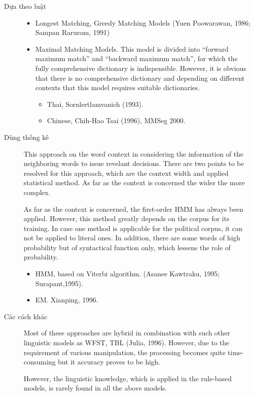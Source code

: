 \documentclass[a4paper,oneside]{book} %
\begin{document}
\begin{description}
\item[Dựa theo luật] 
  \begin{itemize}
  \item Longest Matching, Greedy Matching Models (Yuen Poowarawan, 1986;
    Sampan Rarurom, 1991)
  \item Maximal Matching Models. This model is divided into ``forward
    maximum match'' and ``backward maximum match'', for which the fully
    comprehensive dictionary is indispensible. However, it is obvious
    that there is no comprehensive dictionary and depending on different
    contexts that this model requires suitable dictionaries.
    \begin{itemize}
    \item Thai, Sornlertlamvanich (1993).
    \item Chinese, Chih-Hao Tsai (1996), MMSeg 2000.
    \end{itemize}
  \end{itemize}
\item[Dùng thống kê]
  This approach on the word context in considering
  the information of the neighboring words to issue revelant
  decisions. There are two points to be resolved for this approach,
  which are the context width and applied statistical method. As far
  as the context is concerned the wider the more complex.

  As far as the context is concerned, the first-order HMM has always
  been applied. However, this method greatly depends on the corpus for
  its training. In case one method is applicable for the political
  corpus, it can not be applied to literal ones. In addition, there
  are some words of high probability but of syntactical function only,
  which lessens the role of probability.
  \begin{itemize}
  \item HMM, based on Viterbi algorithm. (Asanee Kawtraku, 1995;
    Surapant,1995).
  \item EM. Xianping, 1996.
  \end{itemize}
\item[Các cách khác]
  Most of these approaches are hybrid in combination with such other
  linguistic models as WFST, TBL (Julia, 1996). However, due to the
  requirement of various manipulation, the processing becomes quite
  time-consuming but it accuracy proves to be high.

  However, the linguistic knowledge, which is applied in the
  rule-based models, is rarely found in all the above models.
\end{description}
\end{document}
